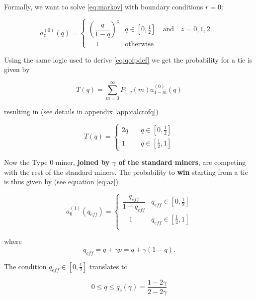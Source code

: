 \documentclass[letterpaper,12pt]{report}
\theoremstyle{plain}
\theoremstyle{definition}
\begin{document}
Formally, we want to solve \ref{eq:markov} with boundary conditions $r=0$:

\begin{equation}\label{eq:bz}
\mathit{a}_z^{(0)}(q)=\begin{cases}\left( \dfrac{q}{1-q}\right)^z & q\in [0,\frac{1}{2}] \quad \mathrm{and} \quad z=0,1,2\dots \\ \quad 1 & \mathrm{otherwise} \end{cases}
\end{equation}

Using the same logic used to derive \ref{eq:qofpdef} we get the probability for a tie is given by

\begin{equation}\label{eq:qofpdef}
\mathit{T}(q)= \sum_{m=0}^{\infty}\mathit{P}_{1,q}(m)\mathit{a}^{(0)}_{1-m}(q)
\end{equation}

resulting in (see details in appendix \ref{app:calctofq})

\begin{equation}\label{eq:qofp}
\mathit{T}(q)=
\begin{cases}
2q & \quad q \in [0,\frac{1}{2}] \\
1 & \quad q \in [\frac{1}{2},1] 
\end{cases}
\end{equation}

Now the Type 0 miner, \textbf{joined by $\gamma$ of the standard miners}, are competing with the rest of the standard miners. The probability to \textbf{win} starting from a tie is thus given by (see equation \ref{eq:az}) 

\begin{equation}\label{eq:azeroeff}
\mathit{a}^{(1)}_0(q_{eff})=\begin{cases} \dfrac{q_{eff}}{1-q_{eff}} & q_{eff}\in [0,\frac{1}{2}] \\  
\quad 1 & q_{eff}\in [\frac{1}{2},1] \\ \end{cases}
\end{equation}

where 
\begin{equation}\label{qeff}
q_{eff}=q+\gamma p=q+\gamma(1-q).
\end{equation}

The condition $q_{eff}\in [0,\frac{1}{2}]$ translates to 

\begin{equation}\label{qcrit}
0\leq q\leq q_{c}(\gamma)=\dfrac{1-2\gamma}{2-2\gamma}
\end{equation}
\end{document}
